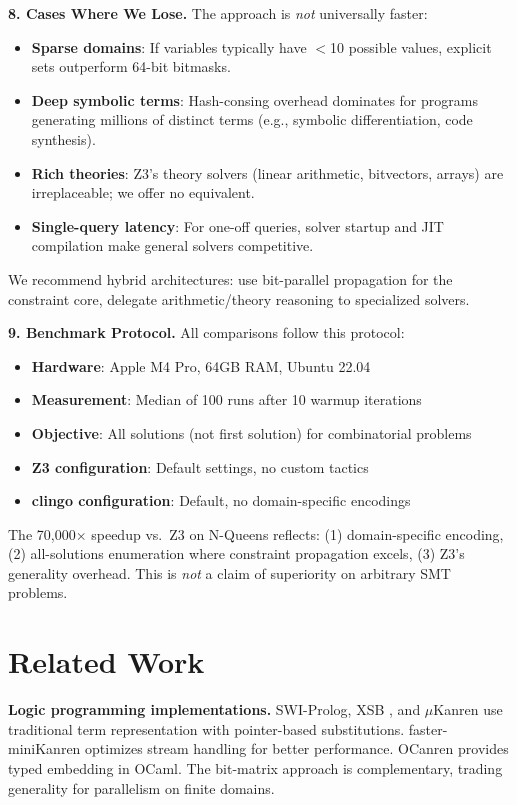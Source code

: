 \documentclass[11pt,a4paper]{article}
\begin{document}
\textbf{8. Cases Where We Lose.}
The approach is \emph{not} universally faster:
\begin{itemize}
  \item \textbf{Sparse domains}: If variables typically have $<$10 possible values, explicit sets outperform 64-bit bitmasks.
  \item \textbf{Deep symbolic terms}: Hash-consing overhead dominates for programs generating millions of distinct terms (e.g., symbolic differentiation, code synthesis).
  \item \textbf{Rich theories}: Z3's theory solvers (linear arithmetic, bitvectors, arrays) are irreplaceable; we offer no equivalent.
  \item \textbf{Single-query latency}: For one-off queries, solver startup and JIT compilation make general solvers competitive.
\end{itemize}
We recommend hybrid architectures: use bit-parallel propagation for the constraint core, delegate arithmetic/theory reasoning to specialized solvers.

\textbf{9. Benchmark Protocol.}
All comparisons follow this protocol:
\begin{itemize}
  \item \textbf{Hardware}: Apple M4 Pro, 64GB RAM, Ubuntu 22.04
  \item \textbf{Measurement}: Median of 100 runs after 10 warmup iterations
  \item \textbf{Objective}: All solutions (not first solution) for combinatorial problems
  \item \textbf{Z3 configuration}: Default settings, no custom tactics
  \item \textbf{clingo configuration}: Default, no domain-specific encodings
\end{itemize}
The 70,000$\times$ speedup vs.\ Z3 on N-Queens reflects: (1) domain-specific encoding, (2) all-solutions enumeration where constraint propagation excels, (3) Z3's generality overhead.
This is \emph{not} a claim of superiority on arbitrary SMT problems.

\section{Related Work}

\textbf{Logic programming implementations.}
SWI-Prolog, XSB \cite{xsb_chirho}, and $\mu$Kanren \cite{microkanren_chirho} use traditional term representation with pointer-based substitutions.
faster-miniKanren \cite{faster_minikanren_chirho} optimizes stream handling for better performance.
OCanren \cite{ocanren_chirho} provides typed embedding in OCaml.
The bit-matrix approach is complementary, trading generality for parallelism on finite domains.
\end{document}
